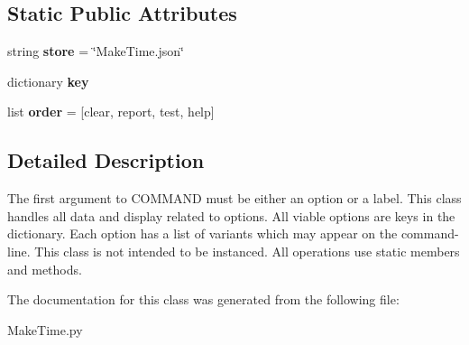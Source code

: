 \subsection*{Static Public Attributes}
\begin{DoxyCompactItemize}
\item 
\hypertarget{classc_1_1_make_time_1_1_option_aeb22c8cafa69f0e4599c896ce54b4212}{}string {\bfseries store} = \char`\"{}Make\+Time.\+json\char`\"{}\label{classc_1_1_make_time_1_1_option_aeb22c8cafa69f0e4599c896ce54b4212}

\item 
\hypertarget{classc_1_1_make_time_1_1_option_a571699b044ea236a203ff2991b512684}{}dictionary {\bfseries key}\label{classc_1_1_make_time_1_1_option_a571699b044ea236a203ff2991b512684}

\item 
\hypertarget{classc_1_1_make_time_1_1_option_a25107ccb7b35e7df1a5e012c7ddf41de}{}list {\bfseries order} = \mbox{[}\textquotesingle{}clear\textquotesingle{}, \textquotesingle{}report\textquotesingle{}, \textquotesingle{}test\textquotesingle{}, \textquotesingle{}help\textquotesingle{}\mbox{]}\label{classc_1_1_make_time_1_1_option_a25107ccb7b35e7df1a5e012c7ddf41de}

\end{DoxyCompactItemize}


\subsection{Detailed Description}
\begin{DoxyVerb}The first argument to {COMMAND} must be either an option or a label.
This class handles all data and display related to options.
All viable options are keys in the dictionary.
Each option has a list of variants which may appear on the command-line.
This class is not intended to be instanced.
All operations use static members and methods.
\end{DoxyVerb}
 

The documentation for this class was generated from the following file\+:\begin{DoxyCompactItemize}
\item 
Make\+Time.\+py\end{DoxyCompactItemize}

